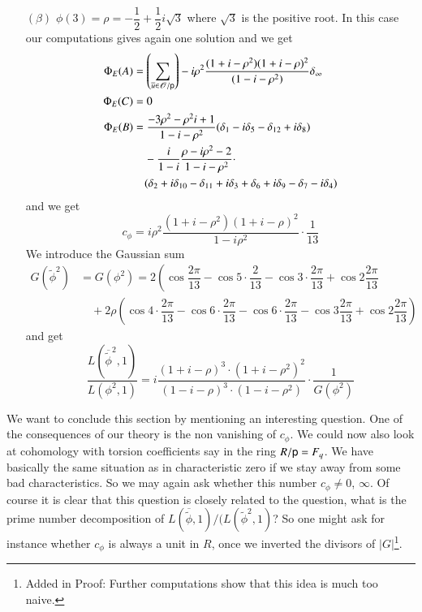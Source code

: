 \begin{itemize}
\begin{itemize}
\item[$(\beta)$] $\phi(3)=\rho=-\dfrac{1}{2}+\dfrac{1}{2}i\sqrt{3}$ where $\sqrt{3}$ is the positive root. In this case our computations gives again one solution and we get
\begin{align*}
\Phi_{E}(A) &=\left(\sum\limits_{\overline{u}\in \mathscr{O}/\mathsf{p}}\right)-i\rho^{2}\dfrac{(1+i-\rho^{2})(1+i-\rho)^{2}}{(1-i-\rho^{2})}\delta_{\infty}\\
\Phi_{E}(C) &=0\\
\Phi_{E}(B) &= \dfrac{-3\rho^{2}-\rho^{2}i+1}{1-i-\rho^{2}}(\delta_{1}-i\delta_{5}-\delta_{12}+i\delta_{8})\\
&\quad -\dfrac{i}{1-i}\dfrac{\rho-i\rho^{2}-2}{1-i-\rho^{2}}\cdot\\
&\quad (\delta_{2}+i\delta_{10}-\delta_{11}+i\delta_{3}+\delta_{6}+i\delta_{9}-\delta_{7}-i\delta_{4})
\end{align*}\pageoriginale
and we get
$$
c_{\phi}=i\rho^{2}\dfrac{(1+i-\rho^{2})(1+i-\rho)^{2}}{1-i\rho^{2}}\cdot \dfrac{1}{13}
$$
We introduce the Gaussian sum
{\fontsize{9}{11}\selectfont
\begin{align*}
G(\widetilde{\phi}^{2})&= G(\phi^{2})=2\left(\cos\dfrac{2\pi}{13}-\cos 5\cdot \dfrac{2}{13}-\cos 3\cdot \dfrac{2\pi}{13}+\cos 2\dfrac{2\pi}{13}\right.\\
&\quad +2\rho\left(\cos 4\cdot \dfrac{2\pi}{13}-\cos 6\cdot \dfrac{2\pi}{13}-\cos 6\cdot \dfrac{2\pi}{13}-\cos 3\dfrac{2\pi}{13}+\cos 2\dfrac{2\pi}{13}\right)
\end{align*}}\relax
and get
$$
\dfrac{L(\overline{\widetilde{\phi}}^{2},1)}{L(\phi^{2},1)}=i\dfrac{(1+i-\rho)^{3}\cdot (1+i-\rho^{2})^{2}}{(1-i-\rho)^{3}\cdot (1-i-\rho^{2})}\cdot \dfrac{1}{G(\phi^{2})}
$$
\end{itemize}
\end{itemize}

We want to conclude this section by mentioning an interesting question. One of the consequences of our theory is the non vanishing of $c_{\phi}$. We could now also look at cohomology with torsion coefficients say in the ring $R/\mathsf{p}=F_{q}$. We have basically the same situation as in characteristic zero if we stay away from some bad characteristics. So we may again ask whether this number $c_{\phi}\neq 0$, $\infty$. Of course it is clear that this question is closely related to the question, what is the prime number decomposition of $L(\overline{\widetilde{\phi}},1)/(L(\widetilde{\phi}^{2},1)$? So one might ask for instance whether $c_{\phi}$ is always a unit in $R$, once we inverted the divisors of $|G|$\footnote[2]{Added in Proof: Further computations show that this idea is much too naive.}.

